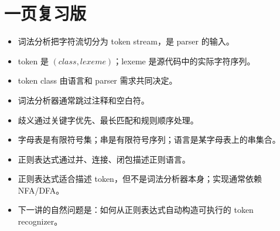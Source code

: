 \documentclass[11pt,a4paper]{article}
\begin{document}
\section{一页复习版}

\begin{itemize}
  \item 词法分析把字符流切分为 token stream，是 parser 的输入。
  \item token 是 $(class, lexeme)$；lexeme 是源代码中的实际字符序列。
  \item token class 由语言和 parser 需求共同决定。
  \item 词法分析器通常跳过注释和空白符。
  \item 歧义通过关键字优先、最长匹配和规则顺序处理。
  \item 字母表是有限符号集；串是有限符号序列；语言是某字母表上的串集合。
  \item 正则表达式通过并、连接、闭包描述正则语言。
  \item 正则表达式适合描述 token，但不是词法分析器本身；实现通常依赖 NFA/DFA。
  \item 下一讲的自然问题是：如何从正则表达式自动构造可执行的 token recognizer。
\end{itemize}
\end{document}
